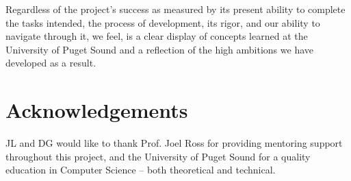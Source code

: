 \documentclass{acm_proc_article-sp}
\begin{document}
Regardless of the project's success as measured by its present ability to complete the tasks intended, the process of development, its rigor, and our ability to navigate through it, we feel, is a clear display of concepts learned at the University of Puget Sound and a reflection of the high ambitions we have developed as a result.

\section{Acknowledgements}
JL and DG would like to thank Prof. Joel Ross for providing mentoring support throughout this project, and the University of Puget Sound for a quality education in Computer Science -- both theoretical and technical.


  
%
%


\balancecolumns

\end{document}
